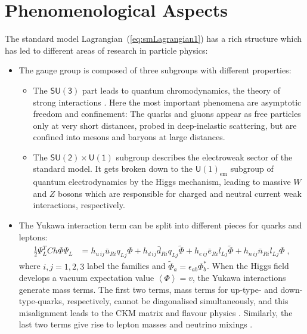 \documentclass[12pt]{report}
\newcommand{\ls}{{\ensuremath{\scriptscriptstyle L}}}
\newcommand{\rs}{{\ensuremath{\scriptscriptstyle R}}}
\newcommand{\2}{\ensuremath{\sqrt{2}\,}}
\begin{document}
    \section{Phenomenological Aspects}
    The standard model Lagrangian~(\ref{eq:smLagrangian1}) has a rich
    structure which has led to different areas of research in particle physics:
    \begin{itemize}
      \item The gauge group is composed of three subgroups with different properties:
        \begin{itemize}
          \item The $\mathsf{SU(3)}$ part leads to quantum chromodynamics, the theory of strong
            interactions \cite{ecker}. Here the most important phenomena are asymptotic
            freedom and confinement: The quarks and gluons appear as free particles only at very
            short distances, probed in deep-inelastic scattering, but are confined into mesons 
            and baryons at large distances.
          \item The $\mathsf{SU(2) \times U(1)}$ subgroup describes the electroweak sector of the
            standard model. It gets broken down to the $\mathsf U(1)_\text{em}$ subgroup of quantum
            electrodynamics by the Higgs mechanism, leading to massive $W$ and $Z$ bosons which are 
            responsible for charged and neutral current weak interactions, respectively.
      \end{itemize}
      \item The Yukawa interaction term can be split into different pieces for quarks and leptons:
        \begin{align}
          \frac{1}{2} \Psi_L^T C h \Phi \Psi_L &= h_{u \, ij} \bar{u}_{\rs i} q_{\ls j} \Phi + h_{d \, ij}
          \bar{d}_{\rs i} q_{\ls j} \widetilde{\Phi} +h_{e \, ij} \bar{e}_{\rs i} l_{\ls j}
          \widetilde{\Phi} +h_{n \, ij} \bar{n}_{\rs i} l_{\ls j} \Phi\;,
        \end{align}
        where $i,j=1,2,3$ label the families and $\widetilde{\Phi}_a =\epsilon_{ab} \Phi_b^*$. 
        When the Higgs field develops a vacuum expectation
        value $\left<\Phi\right>=v$, the Yukawa interactions generate mass terms. The first two terms,
        mass terms for up-type- and down-type-quarks, respectively, cannot be diagonalised 
        simultaneously,
        and this misalignment leads to the CKM matrix and flavour physics \cite{fleischer}. 
        Similarly, the
        last two terms give rise to lepton masses and neutrino mixings \cite{lindner}.
    \end{itemize}
    
\end{document}
